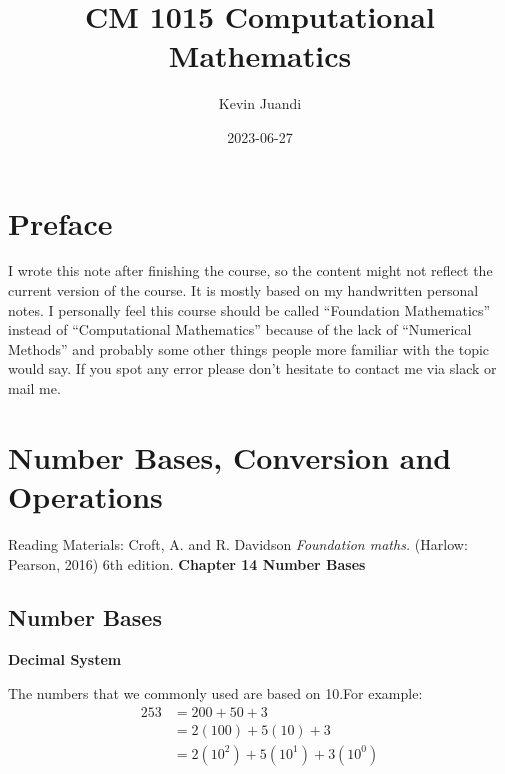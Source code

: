 \documentclass[
]{book}
\title{CM 1015 Computational Mathematics}
\author{Kevin Juandi}
\date{2023-06-27}
\begin{document}
\frontmatter
\maketitle
\ifdefined\Shaded\renewenvironment{Shaded}{\begin{tcolorbox}[interior hidden, sharp corners, enhanced, borderline west={3pt}{0pt}{shadecolor}, frame hidden, boxrule=0pt, breakable]}{\end{tcolorbox}}\fi

\mainmatter
\hypertarget{preface}{%
\chapter*{Preface}\label{preface}}

I wrote this note after finishing the course, so the content might not
reflect the current version of the course. It is mostly based on my
handwritten personal notes. I personally feel this course should be
called ``Foundation Mathematics'' instead of ``Computational
Mathematics'' because of the lack of ``Numerical Methods'' and probably
some other things people more familiar with the topic would say. If you
spot any error please don't hesitate to contact me via slack or mail me.

\hypertarget{number-bases-conversion-and-operations}{%
\chapter{Number Bases, Conversion and
Operations}\label{number-bases-conversion-and-operations}}

\newcommand*{\carry}[1][1]{\overset{#1}}

Reading Materials: \newline Croft, A. and R. Davidson \emph{Foundation
maths.} (Harlow: Pearson, 2016) 6th edition. \textbf{Chapter 14 Number
Bases}

\hypertarget{number-bases}{%
\section{Number Bases}\label{number-bases}}

\textbf{Decimal System}

The numbers that we commonly used are based on 10.\newline For example:
\begin{equation} \label{eq1}
\begin{split}
253 & = 200 + 50 + 3 \\
& = 2(100) + 5(10) + 3 \\
& = 2(10^2)+ 5(10^1) + 3(10^0)
\end{split}
\end{equation}
\end{document}
